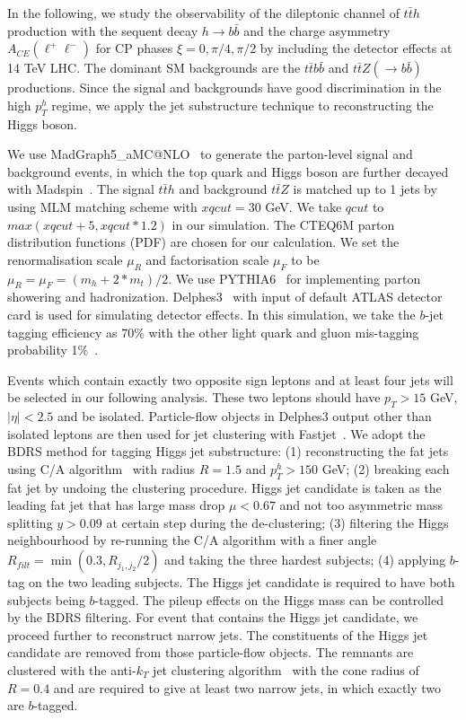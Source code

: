 \documentclass[twocolumn,prd,noshowpacs,nofootinbib,amsmath,amssymb,superscriptaddress,preprintnumbers]{revtex4}
\begin{document}
In the following, we study the observability of the dileptonic channel of $t\bar{t}h$ production with the sequent decay $h \to b\bar{b}$ and the charge asymmetry $A_{CE}(\ell^+\ell^-)$ for CP phases $\xi=0,\pi/4,\pi/2$ by including the detector effects at 14 TeV LHC. The dominant SM backgrounds are the $t\bar{t}b\bar{b}$ and $t\bar{t}Z(\to b\bar{b})$ productions. Since the signal and backgrounds have good discrimination in the high $p^h_T$ regime, we apply the jet substructure technique to reconstructing the Higgs boson.


We use \textsf{MadGraph5\_aMC@NLO}~\cite{Alwall:2014hca} to generate the parton-level signal and background events, in which the top quark and Higgs boson are further decayed with \textsf{Madspin}~\cite{Artoisenet:2012st}. The signal $t\bar{t}h$ and background $t\bar{t}Z$ is matched up to 1 jets by using MLM matching scheme \cite{mlm} with $xqcut=30$ GeV. We take $qcut$ to $max(xqcut+5, xqcut*1.2)$ \cite{matching} in our simulation. The CTEQ6M parton distribution functions (PDF) \cite{cteq} are chosen for our calculation. We set the renormalisation scale $\mu_R$ and factorisation scale $\mu_F$ to be $\mu_R=\mu_F=(m_h+2*m_t)/2$. We use \textsf{PYTHIA6}~\cite{Sjostrand:2006za} for implementing parton showering and hadronization. \textsf{Delphes3}~\cite{deFavereau:2013fsa} with input of default ATLAS detector card is used for simulating detector effects. In this simulation, we take the $b$-jet tagging efficiency as 70\% with the other light quark and gluon mis-tagging probability 1\%~\cite{Aad:2015ydr}.

Events which contain exactly two opposite sign leptons and at least four jets will be selected in our following analysis. These two leptons should have $p_T>15$ GeV, $|\eta|<2.5$ and be isolated. Particle-flow objects in \textsf{Delphes3} output other than isolated leptons are then used for jet clustering with \textsf{Fastjet}~\cite{Cacciari:2011ma}. We adopt the BDRS method for tagging Higgs jet substructure: (1) reconstructing the fat jets using C/A algorithm~\cite{Dokshitzer:1997in} with radius $R=1.5$ and $p^h_T >150$ GeV; (2) breaking each fat jet by undoing the clustering procedure. Higgs jet candidate is taken as the leading fat jet that has large mass drop $\mu<0.67$ and not too asymmetric mass splitting $y>0.09$ at certain step during the de-clustering; (3) filtering the Higgs neighbourhood by re-running the C/A algorithm with a finer angle $R_{filt} = \min(0.3,R_{j_1,j_2}/2)$ and taking the three hardest subjects; (4) applying $b$-tag on the two leading subjects. The Higgs jet candidate is required to have both subjects being $b$-tagged.  The pileup effects on the Higgs mass can be controlled by the BDRS filtering.
For event that contains the Higgs jet candidate, we proceed further to reconstruct narrow jets. The constituents of the Higgs jet candidate are removed from those particle-flow objects. The remnants are clustered with the anti-$k_T$ jet clustering algorithm~\cite{Cacciari:2008gp} with the cone radius of $R=0.4$ and are required to give at least two narrow jets, in which exactly two are $b$-tagged.
\end{document}
